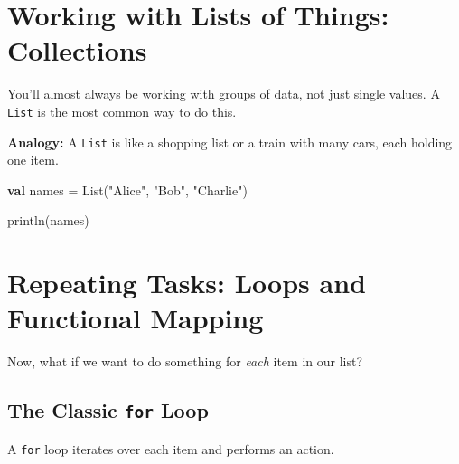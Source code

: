 \documentclass[
  letterpaper,
  DIV=11,
  numbers=noendperiod]{scrreprt}
\newenvironment{Shaded}{\begin{snugshade}}{\end{snugshade}}
\newcommand{\ControlFlowTok}[1]{\textcolor[rgb]{0.00,0.23,0.31}{\textbf{#1}}}
\newcommand{\ExtensionTok}[1]{\textcolor[rgb]{0.00,0.23,0.31}{#1}}
\newcommand{\FunctionTok}[1]{\textcolor[rgb]{0.28,0.35,0.67}{#1}}
\newcommand{\KeywordTok}[1]{\textcolor[rgb]{0.00,0.23,0.31}{\textbf{#1}}}
\newcommand{\NormalTok}[1]{\textcolor[rgb]{0.00,0.23,0.31}{#1}}
\newcommand{\OperatorTok}[1]{\textcolor[rgb]{0.37,0.37,0.37}{#1}}
\newcommand{\SpecialStringTok}[1]{\textcolor[rgb]{0.13,0.47,0.30}{#1}}
\newcommand{\StringTok}[1]{\textcolor[rgb]{0.13,0.47,0.30}{#1}}
\begin{document}
\section{Working with Lists of Things:
Collections}\label{working-with-lists-of-things-collections}

You'll almost always be working with groups of data, not just single
values. A \texttt{List} is the most common way to do this.

\textbf{Analogy:} A \texttt{List} is like a shopping list or a train
with many cars, each holding one item.

\begin{Shaded}
\begin{Highlighting}[]
\KeywordTok{val}\NormalTok{ names }\OperatorTok{=} \ExtensionTok{List}\OperatorTok{(}\StringTok{"Alice"}\OperatorTok{,} \StringTok{"Bob"}\OperatorTok{,} \StringTok{"Charlie"}\OperatorTok{)}

\FunctionTok{println}\OperatorTok{(}\NormalTok{names}\OperatorTok{)}
\end{Highlighting}
\end{Shaded}

\section{Repeating Tasks: Loops and Functional
Mapping}\label{repeating-tasks-loops-and-functional-mapping}

Now, what if we want to do something for \emph{each} item in our list?

\subsection{\texorpdfstring{The Classic \texttt{for}
Loop}{The Classic for Loop}}\label{the-classic-for-loop}

A \texttt{for} loop iterates over each item and performs an action.

\begin{Shaded}
\end{Shaded}
\end{document}

